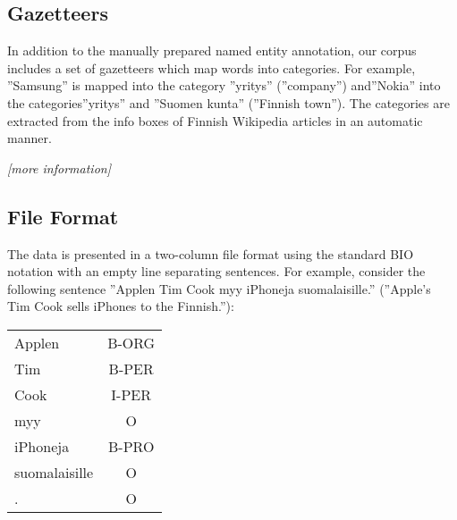\documentclass[11pt]{article}
\newcommand{\fixme}[1]{\textsl{[#1]}}
\begin{document}
        

\subsection{Gazetteers}
\label{sec: gazetteers}


In addition to the manually prepared named entity annotation, our corpus includes a set of gazetteers which map words into categories. For example, ''Samsung'' is mapped into the category ''yritys'' (''company'') and''Nokia'' into the categories''yritys'' and ''Suomen kunta'' (''Finnish town''). The categories are extracted from the info boxes of Finnish Wikipedia articles in an automatic manner.

\fixme{more information}

\subsection{File Format}

The data is presented in a two-column file format using the standard BIO notation with an empty line separating sentences. For example, consider the following sentence ''Applen Tim Cook myy iPhoneja suomalaisille.'' (''Apple's Tim Cook sells iPhones to the Finnish.''):
\begin{center}
\begin{tabular}{lc} 
Applen & B-ORG  \\      
Tim & B-PER \\
Cook & I-PER \\
myy & O \\
iPhoneja & B-PRO \\      
suomalaisille & O \\
. & O \\
\end{tabular}
\end{center}


\end{document}
